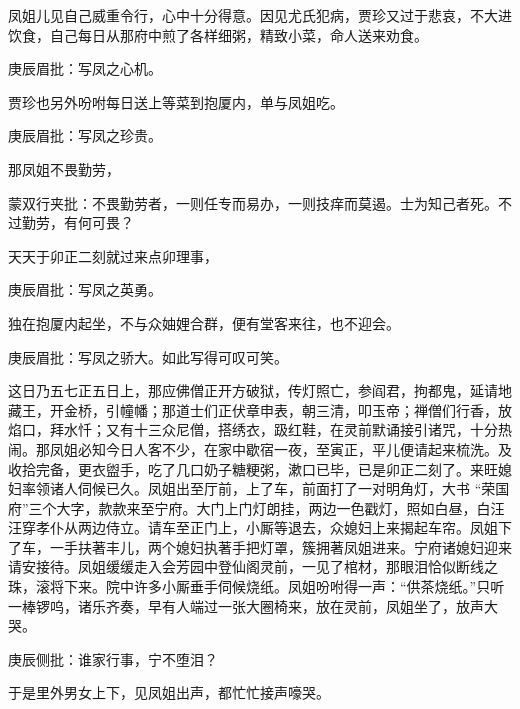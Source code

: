 \begin{parag}


    凤姐儿见自己威重令行，心中十分得意。因见尤氏犯病，贾珍又过于悲哀，不大进饮食，自己每日从那府中煎了各样细粥，精致小菜，命人送来劝食。\begin{note}庚辰眉批：写凤之心机。\end{note}贾珍也另外吩咐每日送上等菜到抱厦内，单与凤姐吃。\begin{note}庚辰眉批：写凤之珍贵。\end{note}那凤姐不畏勤劳，\begin{note}蒙双行夹批：不畏勤劳者，一则任专而易办，一则技痒而莫遏。士为知己者死。不过勤劳，有何可畏？\end{note}天天于卯正二刻就过来点卯理事，\begin{note}庚辰眉批：写凤之英勇。\end{note}独在抱厦内起坐，不与众妯娌合群，便有堂客来往，也不迎会。\begin{note}庚辰眉批：写凤之骄大。如此写得可叹可笑。\end{note}
\end{parag}


\begin{parag}


    这日乃五七正五日上，那应佛僧正开方破狱，传灯照亡，参阎君，拘都鬼，延请地藏王，开金桥，引幢幡；那道士们正伏章申表，朝三清，叩玉帝；禅僧们行香，放焰口，拜水忏；又有十三众尼僧，搭绣衣，趿红鞋，在灵前默诵接引诸咒，十分热闹。那凤姐必知今日人客不少，在家中歇宿一夜，至寅正，平儿便请起来梳洗。及收拾完备，更衣盥手，吃了几口奶子糖粳粥，漱口已毕，已是卯正二刻了。来旺媳妇率领诸人伺候已久。凤姐出至厅前，上了车，前面打了一对明角灯，大书 “荣国府”三个大字，款款来至宁府。大门上门灯朗挂，两边一色戳灯，照如白昼，白汪汪穿孝仆从两边侍立。请车至正门上，小厮等退去，众媳妇上来揭起车帘。凤姐下了车，一手扶著丰儿，两个媳妇执著手把灯罩，簇拥著凤姐进来。宁府诸媳妇迎来请安接待。凤姐缓缓走入会芳园中登仙阁灵前，一见了棺材，那眼泪恰似断线之珠，滚将下来。院中许多小厮垂手伺候烧纸。凤姐吩咐得一声：“供茶烧纸。”只听一棒锣呜，诸乐齐奏，早有人端过一张大圈椅来，放在灵前，凤姐坐了，放声大哭。\begin{note}庚辰侧批：谁家行事，宁不堕泪？\end{note}于是里外男女上下，见凤姐出声，都忙忙接声嚎哭。
\end{parag}


